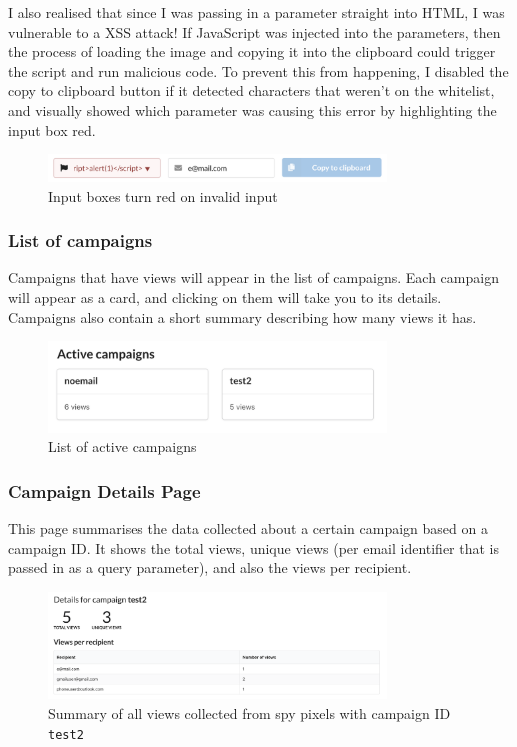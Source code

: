 \documentclass{article}
\begin{document}
I also realised that since I was passing in a parameter straight into HTML, I was vulnerable to a XSS attack! If JavaScript was injected into the parameters, then the process of loading the image and copying it into the clipboard could trigger the script and run malicious code. To prevent this from happening, I disabled the copy to clipboard button if it detected characters that weren't on the whitelist, and visually showed which parameter was causing this error by highlighting the input box red.

\begin{figure}[H]
\centering
\includegraphics[width=0.8\textwidth]{images/xss-block.png}
\caption{Input boxes turn red on invalid input}
\end{figure}

\subsubsection{List of campaigns}

Campaigns that have views will appear in the list of campaigns. Each campaign will appear as a card, and clicking on them will take you to its details. Campaigns also contain a short summary describing how many views it has.

\begin{figure}[H]
\centering
\includegraphics[width=0.8\textwidth]{images/active-campaigns.png}
\caption{List of active campaigns}
\end{figure}

\subsubsection{Campaign Details Page}

This page summarises the data collected about a certain campaign based on a campaign ID. It shows the total views, unique views (per email identifier that is passed in as a query parameter), and also the views per recipient.

\begin{figure}[H]
\centering
\includegraphics[width=0.8\textwidth]{images/summary-campaign.png}
\caption{Summary of all views collected from spy pixels with campaign ID \texttt{test2}}
\end{figure}
\end{document}
